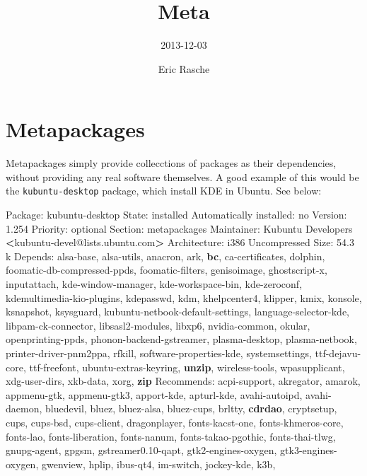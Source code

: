 \documentclass[]{article}
\title{Meta}
\author{2013-12-03}
\date{Eric Rasche}
\newenvironment{Shaded}{}{}
\newcommand{\KeywordTok}[1]{\textcolor[rgb]{0.00,0.44,0.13}{\textbf{{#1}}}}
\newcommand{\NormalTok}[1]{{#1}}
\begin{document}
\maketitle

\section{Metapackages}

Metapackages simply provide collecctions of packages as their
dependencies, without providing any real software themselves. A good
example of this would be the \texttt{kubuntu-desktop} package, which
install KDE in Ubuntu. See below:

\begin{Shaded}
\begin{Highlighting}[]
\NormalTok{Package: kubuntu-desktop                 }
\NormalTok{State: installed}
\NormalTok{Automatically installed: no}
\NormalTok{Version: 1.254}
\NormalTok{Priority: optional}
\NormalTok{Section: metapackages}
\NormalTok{Maintainer: Kubuntu Developers }\KeywordTok{<}\NormalTok{kubuntu-devel@lists.ubuntu.com}\KeywordTok{>}
\NormalTok{Architecture: i386}
\NormalTok{Uncompressed Size: 54.3 k}
\NormalTok{Depends: alsa-base, alsa-utils, anacron, ark, }\KeywordTok{bc}\NormalTok{, ca-certificates, dolphin, foomatic-db-compressed-ppds, foomatic-filters, genisoimage,}
         \NormalTok{ghostscript-x, inputattach, kde-window-manager, kde-workspace-bin, kde-zeroconf, kdemultimedia-kio-plugins, kdepasswd, kdm,}
         \NormalTok{khelpcenter4, klipper, kmix, konsole, ksnapshot, ksysguard, kubuntu-netbook-default-settings, language-selector-kde,}
         \NormalTok{libpam-ck-connector, libsasl2-modules, libxp6, nvidia-common, okular, openprinting-ppds, phonon-backend-gstreamer,}
         \NormalTok{plasma-desktop, plasma-netbook, printer-driver-pnm2ppa, rfkill, software-properties-kde, systemsettings, ttf-dejavu-core,}
         \NormalTok{ttf-freefont, ubuntu-extras-keyring, }\KeywordTok{unzip}\NormalTok{, wireless-tools, wpasupplicant, xdg-user-dirs, xkb-data, xorg, }\KeywordTok{zip}
\NormalTok{Recommends: acpi-support, akregator, amarok, appmenu-gtk, appmenu-gtk3, apport-kde, apturl-kde, avahi-autoipd, avahi-daemon, bluedevil,}
            \NormalTok{bluez, bluez-alsa, bluez-cups, brltty, }\KeywordTok{cdrdao}\NormalTok{, cryptsetup, cups, cups-bsd, cups-client, dragonplayer, fonts-kacst-one,}
            \NormalTok{fonts-khmeros-core, fonts-lao, fonts-liberation, fonts-nanum, fonts-takao-pgothic, fonts-thai-tlwg, gnupg-agent, gpgsm,}
            \NormalTok{gstreamer0.10-qapt, gtk2-engines-oxygen, gtk3-engines-oxygen, gwenview, hplip, ibus-qt4, im-switch, jockey-kde, k3b,}

\end{Highlighting}
\end{Shaded}
\end{document}
